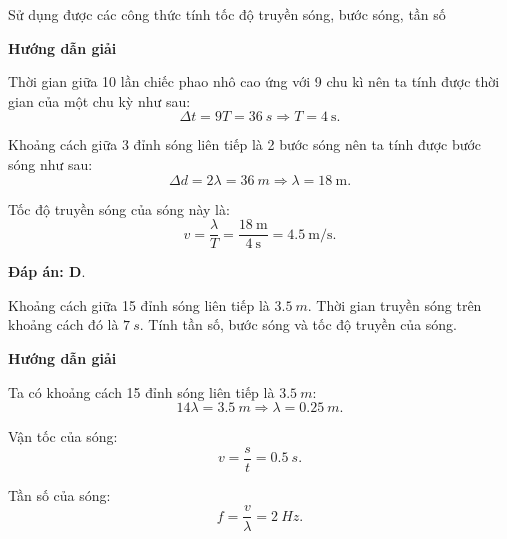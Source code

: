\begin{dang}{Sử dụng được các công thức tính tốc độ truyền sóng, bước sóng, tần số}
	{
		\begin{center}
			\textbf{Hướng dẫn giải}
		\end{center}
		
		Thời gian giữa 10 lần chiếc phao nhô cao ứng với 9 chu kì nên ta tính được thời gian của một chu kỳ như sau:
		$$\Delta t=9T=\SI{36}{s}\Rightarrow T=\SI{4}{\second}.$$
		
		Khoảng cách giữa 3 đỉnh sóng liên tiếp là 2 bước sóng nên ta tính được bước sóng như sau:
		$$\Delta d=2\lambda=\SI{36}{m}\Rightarrow \lambda=\SI{18}{\meter}.$$
		
		Tốc độ truyền sóng của sóng này là:
		$$v=\dfrac{\lambda}{T}=\dfrac{\SI{18}{\meter}}{\SI{4}{\second}}=\SI{4.5}{\meter/\second}.$$
		
		
		\textbf{Đáp án: D}.
	}
	
	{
		Khoảng cách giữa 15 đỉnh sóng liên tiếp là $\SI{3,5}{m}$. Thời gian truyền sóng trên khoảng cách đó là $\SI{7}{s}$. Tính tần số, bước sóng và tốc độ truyền của sóng.
	}{
		\begin{center}
			\textbf{Hướng dẫn giải}
		\end{center}
		
		Ta có khoảng cách 15 đỉnh sóng liên tiếp là $\SI{3,5}{m}$:
		\begin{equation*}
			14\lambda = \SI{3,5}{m} \Rightarrow \lambda = \SI{0,25}{m}.
		\end{equation*}
		
		Vận tốc của sóng:
		\begin{equation*}
			v=\dfrac{s}{t} = \SI{0,5}{s}.
		\end{equation*}
		
		Tần số của sóng:
		\begin{equation*}
			f = \dfrac{v}{\lambda} =\SI{2}{Hz}.
		\end{equation*}
		
	}
	
\end{dang}